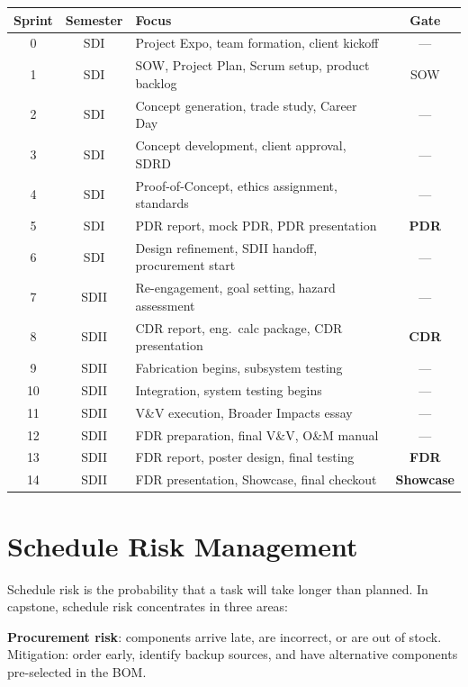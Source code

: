 \begin{center}\small
\begin{tabularx}{\textwidth}{c c X c}
\toprule
\textbf{Sprint} & \textbf{Semester} & \textbf{Focus} & \textbf{Gate} \\
\midrule
0 & SDI & Project Expo, team formation, client kickoff & --- \\
1 & SDI & SOW, Project Plan, Scrum setup, product backlog & SOW \\
2 & SDI & Concept generation, trade study, Career Day & --- \\
3 & SDI & Concept development, client approval, SDRD & --- \\
4 & SDI & Proof-of-Concept, ethics assignment, standards & --- \\
5 & SDI & PDR report, mock PDR, PDR presentation & \textbf{PDR} \\
6 & SDI & Design refinement, SDII handoff, procurement start & --- \\
\midrule
7 & SDII & Re-engagement, goal setting, hazard assessment & --- \\
8 & SDII & CDR report, eng.\ calc package, CDR presentation & \textbf{CDR} \\
9 & SDII & Fabrication begins, subsystem testing & --- \\
10 & SDII & Integration, system testing begins & --- \\
11 & SDII & V\&V execution, Broader Impacts essay & --- \\
12 & SDII & FDR preparation, final V\&V, O\&M manual & --- \\
13 & SDII & FDR report, poster design, final testing & \textbf{FDR} \\
14 & SDII & FDR presentation, Showcase, final checkout & \textbf{Showcase} \\
\bottomrule
\end{tabularx}
\end{center}

\section{Schedule Risk Management}
Schedule risk is the probability that a task will take longer than planned. In capstone, schedule risk concentrates in three areas:

\textbf{Procurement risk}: components arrive late, are incorrect, or are out of stock. Mitigation: order early, identify backup sources, and have alternative components pre-selected in the BOM.

